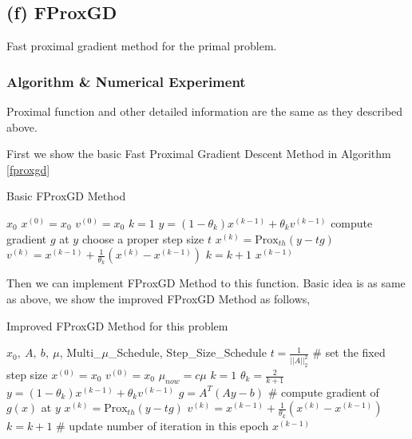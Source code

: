 \documentclass[]{article}
\begin{document}
\subsection{(f) FProxGD}
\noindent
Fast proximal gradient method for the primal problem.

\subsubsection{Algorithm \& Numerical Experiment}

Proximal function and other detailed information are the same as they described above. 

First we show the basic Fast Proximal Gradient Descent Method in Algorithm \ref{fproxgd}


\begin{algorithm}[!h]
	\caption{Basic FProxGD Method}
	\label{fproxgd}
	\begin{algorithmic}
	\REQUIRE $x_0$
	\STATE $x^{(0)}=x_0$
	\STATE $v^{(0)}=x_0$
	\STATE $k=1$
	\STATE $y=(1-\theta_k)x^{(k-1)} + \theta_k v^{(k-1)}$
	\STATE compute gradient $g$ at $y$
	\STATE choose a proper step size $t$
	\STATE $x^{(k)}=\text{Prox}_{th}(y-tg)$
	\STATE $v^{(k)} = x^{(k-1)} + \frac{1}{\theta_k}(x^{(k)}-x^{(k-1)})$
	\STATE $k=k+1$
	\ENDWHILE
	\ENSURE $x^{(k-1)}$
\end{algorithmic}
\end{algorithm}
Then we can implement FProxGD Method to this function. Basic idea is as same as above, we show the improved FProxGD Method as follows,

\begin{algorithm}[!h]
	\caption{Improved FProxGD Method for this problem}
	\label{ifproxgd}
	\begin{algorithmic}
		\REQUIRE $x_0, \ A,\  b,\  \mu $, Multi\_$\mu$\_Schedule, Step\_Size\_Schedule
		\STATE $t = \frac{1}{||A||_2^2}$ \# set the fixed step size
		\STATE $x^{(0)}=x_0$
		\STATE $v^{(0)}=x_0$
		\STATE $\mu_{now} = c\mu$
		\STATE $k = 1$
		\STATE $\theta_k=\frac{2}{k+1}$
		\STATE $y=(1-\theta_k)x^{(k-1)} + \theta_k v^{(k-1)}$
		\STATE $g = A^T(Ay-b)$ \# compute gradient of $g(x)$ at $y$
		\STATE $x^{(k)}=\text{Prox}_{th}(y-tg)$
		\STATE $v^{(k)} = x^{(k-1)} + \frac{1}{\theta_k}(x^{(k)}-x^{(k-1)})$
		\STATE $k = k + 1$ \# update number of iteration in this epoch
		\ENDWHILE
		\ENDFOR
		\ENSURE $x^{(k-1)}$
	\end{algorithmic}
\end{algorithm}
\end{document}
